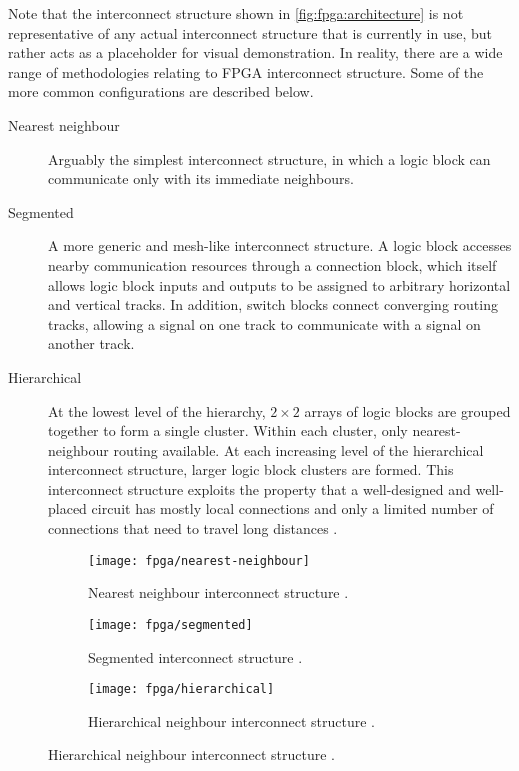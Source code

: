 Note that the interconnect structure shown in \autoref{fig:fpga:architecture} is
not representative of any actual interconnect structure that is currently in
use, but rather acts as a placeholder for visual demonstration. In reality,
there are a wide range of methodologies relating to \gls{FPGA} interconnect
structure. Some of the more common configurations are described below.
\begin{description}
    \item[Nearest neighbour] Arguably the simplest interconnect structure, in
        which a logic block can communicate only with its immediate neighbours.
    \item[Segmented] A more generic and mesh-like interconnect structure. A
        logic block accesses nearby communication resources through a connection
        block, which itself allows logic block inputs and outputs to be assigned
        to arbitrary horizontal and vertical tracks. In addition, switch blocks
        connect converging routing tracks, allowing a signal on one track to
        communicate with a signal on another track.
    \item[Hierarchical] At the lowest level of the hierarchy, $2 \times 2$
        arrays of logic blocks are grouped together to form a single cluster.
        Within each cluster, only nearest-neighbour routing available. At each
        increasing level of the hierarchical interconnect structure, larger
        logic block clusters are formed. This interconnect structure exploits
        the property that a well-designed and well-placed circuit has mostly
        local connections and only a limited number of connections that need to
        travel long distances \cite{Hauck:2007}.
\end{description}

\begin{figure}
    \caption{\gls{FPGA} interconnect structures.}
    \label{fig:fpga:interconnect}

    \centering
    \begin{subfigure}[b]{0.3\textwidth}
        \centering
        \texttt{[image: fpga/nearest-neighbour]}
        \caption[Nearest neighbour interconnect structure.]
            {Nearest neighbour interconnect structure \cite{Hauck:2007}.}
        \label{fig:fpga:interconnect:nearestNeighbour}
    \end{subfigure}
    \quad
    \begin{subfigure}[b]{0.3\textwidth}
        \centering
        \texttt{[image: fpga/segmented]}
        \caption[Segmented interconnect structure.]
            {Segmented interconnect structure \cite{Hauck:2007}.}
        \label{fig:fpga:interconnect:segmented}
    \end{subfigure}
    \quad
    \begin{subfigure}[b]{0.3\textwidth}
        \centering
        \texttt{[image: fpga/hierarchical]}
        \caption[Hierarchical neighbour interconnect structure.]
            {Hierarchical neighbour interconnect structure \cite{Hauck:2007}.}
        \label{fig:fpga:interconnect:hierarchical}
    \end{subfigure}
\end{figure}

